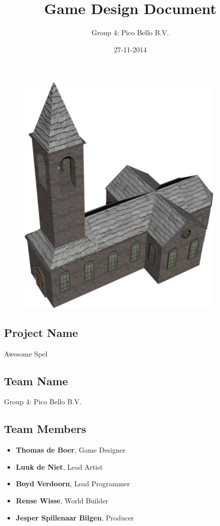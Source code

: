 \documentclass{article}
\title{Game Design Document}
\author{Group 4: Pico Bello B.V.}
\date{27-11-2014}
\begin{document}
	\selectfont



	\maketitle
	\begin{figure}[ht!]
		\centering
		\includegraphics[width=100mm]{images/Front.png}
	\end{figure}
	\newpage
\subsection*{Project Name}
	\qquad Awesome Spel
\subsection*{Team Name}
	\qquad Group 4: Pico Bello B.V.
\subsection*{Team Members}
	\begin{itemize}
		\item \textbf{Thomas de Boer}, Game Designer
		\item \textbf{Luuk de Niet}, Lead Artist
		\item \textbf{Boyd Verdoorn}, Lead Programmer
		\item \textbf{Rense Wisse}, World Builder
		\item \textbf{Jesper Spillenaar Bilgen}, Producer
	\end{itemize}
\end{document}
